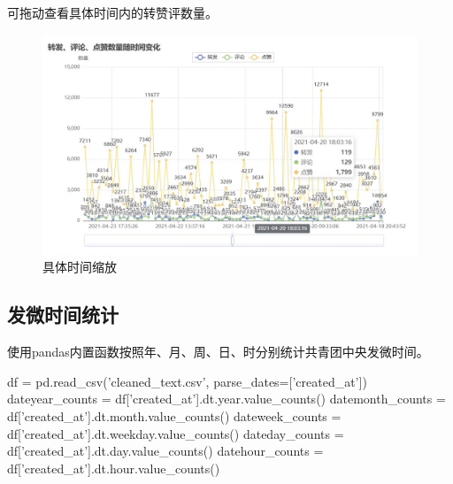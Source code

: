 \par{可拖动查看具体时间内的转赞评数量。}
\begin{figure}[H]
    \centering
    \includegraphics[width=12cm]{figure/3items_s.jpg}
    \caption{具体时间缩放} \label{fig:3items_s}
\end{figure} 

\subsection{发微时间统计}
使用pandas内置函数按照年、月、周、日、时分别统计共青团中央发微时间。
\begin{python}
    df = pd.read_csv('cleaned_text.csv', parse_dates=['created_at'])
    dateyear_counts = df['created_at'].dt.year.value_counts()
    datemonth_counts = df['created_at'].dt.month.value_counts()
    dateweek_counts = df['created_at'].dt.weekday.value_counts()
    dateday_counts = df['created_at'].dt.day.value_counts()
    datehour_counts = df['created_at'].dt.hour.value_counts()
\end{python}

